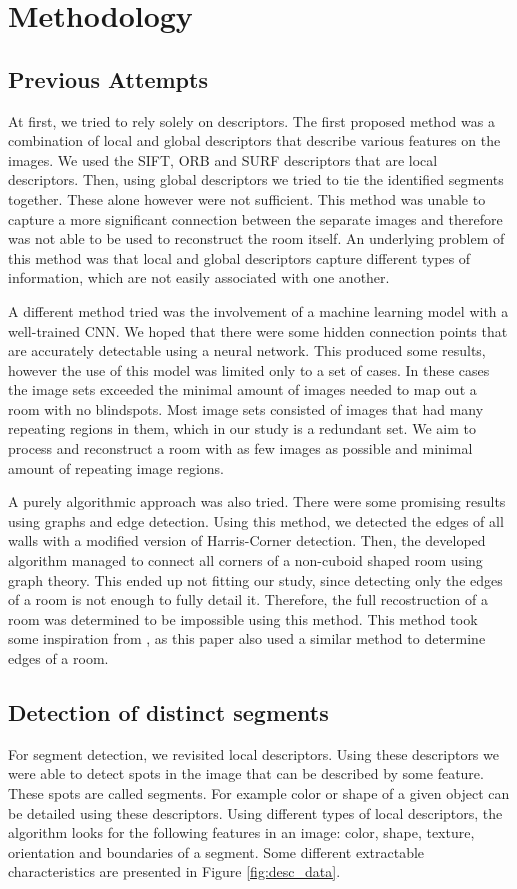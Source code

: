 \section{Methodology}
\label{sec:methodology}

\subsection{Previous Attempts} %
At first, we tried to rely solely on descriptors. The first proposed method was a combination of local and global descriptors that describe various features on the images. We used the SIFT, ORB and SURF descriptors that are local descriptors. Then, using global descriptors we tried to tie the identified segments together. These alone however were not sufficient. This method was unable to capture a more significant connection between the separate images and therefore was not able to be used to reconstruct the room itself. An underlying problem of this method was that local and global descriptors capture different types of information, which are not easily associated with one another.

A different method tried was the involvement of a machine learning model with a well-trained CNN. We hoped that there were some hidden connection points that are accurately detectable using a neural network. This produced some results, however the use of this model was limited only to a set of cases. In these cases the image sets exceeded the minimal amount of images needed to map out a room with no blindspots. Most image sets consisted of images that had many repeating regions in them, which in our study is a redundant set. We aim to process and reconstruct a room with as few images as possible and minimal amount of repeating image regions.   

A purely algorithmic approach was also tried. There were some promising results using graphs and edge detection. Using this method, we detected the edges of all walls with a modified version of Harris-Corner detection. Then, the developed algorithm managed to connect all corners of a non-cuboid shaped room using graph theory. This ended up not fitting our study, since detecting only the edges of a room is not enough to fully detail it. Therefore, the full recostruction of a room was determined to be impossible using this method. This method took some inspiration from \cite{9707088}, as this paper also used a similar method to determine edges of a room.


\subsection{Detection of distinct segments} %
For segment detection, we revisited local descriptors. Using these descriptors we were able to detect spots in the image that can be described by some feature. These spots are called segments. For example color or shape of a given object can be detailed using these descriptors. Using different types of local descriptors, the algorithm looks for the following features in an image: color, shape, texture, orientation and boundaries of a segment. Some different extractable characteristics are presented in Figure \ref{fig:desc_data}.

